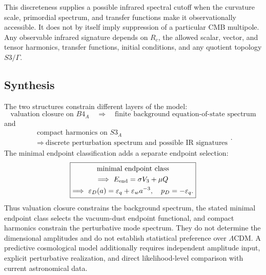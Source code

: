 \documentclass[11pt,a4paper]{article}
\def\Bfour{B4}%
\def\Sthree{S3}%
\numberwithin{equation}{section}
\theoremstyle{remark}
\newcommand{\Sthree}{S^3}
\newcommand{\Bfour}{B^4}
\newcommand{\epsD}{\varepsilon_D}
\newcommand{\pD}{p_D}
\begin{document}
This discreteness supplies a possible infrared spectral cutoff when the curvature scale, primordial spectrum, and transfer functions make it observationally accessible. It does not by itself imply suppression of a particular CMB multipole. Any observable infrared signature depends on \(R_c\), the allowed scalar, vector, and tensor harmonics, transfer functions, initial conditions, and any quotient topology \(\Sthree/\Gamma\).

\subsection{Synthesis}
The two structures constrain different layers of the model:
\begin{equation}
\boxed{
\text{valuation closure on }\Bfour_A
\quad\Longrightarrow\quad
\text{finite background equation-of-state spectrum}
}
\end{equation}
and
\begin{equation}
\boxed{
\begin{gathered}
\text{compact harmonics on }\Sthree_A\\
\Longrightarrow\ \text{discrete perturbation spectrum and possible IR signatures}
\end{gathered}
}.
\end{equation}
The minimal endpoint classification adds a separate endpoint selection:
\begin{equation}
\boxed{
\begin{gathered}
\text{minimal endpoint class}\\
\Longrightarrow\ E_{\rm end}=\sigma V_3+\mu Q\\
\Longrightarrow\ \epsD(a)=\varepsilon_q+\varepsilon_w a^{-3},\quad \pD=-\varepsilon_q .
\end{gathered}
}
\end{equation}
Thus valuation closure constrains the background spectrum, the stated minimal endpoint class selects the vacuum-dust endpoint functional, and compact harmonics constrain the perturbative mode spectrum. They do not determine the dimensional amplitudes and do not establish statistical preference over \(\Lambda\)CDM. A predictive cosmological model additionally requires independent amplitude input, explicit perturbative realization, and direct likelihood-level comparison with current astronomical data.
\end{document}
